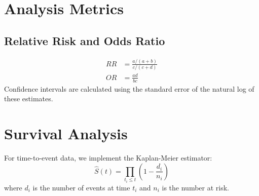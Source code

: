 \documentclass{article}
\begin{document}
\section{Analysis Metrics}
\subsection{Relative Risk and Odds Ratio}
\begin{align}
RR &= \frac{a / (a+b)}{c / (c+d)} \\
OR &= \frac{ad}{bc}
\end{align}
Confidence intervals are calculated using the standard error of the natural log of these estimates.

\section{Survival Analysis}
For time-to-event data, we implement the Kaplan-Meier estimator:
\begin{equation}
\hat{S}(t) = \prod_{t_i \le t} \left(1 - \frac{d_i}{n_i}\right)
\end{equation}
where $d_i$ is the number of events at time $t_i$ and $n_i$ is the number at risk.



\end{document}
